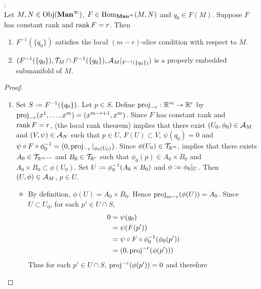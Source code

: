 \documentclass{book}
\begin{document}
	\begin{ex}  : \\
		Let $M, N \in \operatorname{Obj}(\operatorname*{\text{\textbf{Man}}^{\infty}})$, $F \in \operatorname{Hom}_{\operatorname*{\text{\textbf{Man}}^{\infty}}}(M,N)$ and $q_0 \in F(M)$. Suppose $F$ has constant rank and $\operatorname{\text{rank}} F = r$. Then 
		\begin{enumerate}
			\item $F^{-1}(\{q_0\})$ satisfies the local $(m-r)$-slice condition with respect to $M$. 
			\item $(F^{-1}(\{q_0\}), \mathcal{T}_M \cap F^{-1}(\{q_0\}), \mathcal{A}_M|_{F^{-1}(\{q_0\})})$ is a properly embedded submanifold of $M$.
		\end{enumerate}
	\end{ex}

	\begin{proof}\
		\begin{enumerate}
			\item Set $S \vcentcolon= F^{-1}(\{q_0\})$. Let $p \in S$. Define $\operatorname{\text{proj}}_{-r}: \mathbb{R}^m \rightarrow \mathbb{R}^{r}$ by $\operatorname{\text{proj}}_{-r}(x^1, \ldots, x^m) = (x^{m-r+1}, x^{m})$. Since $F$ has constant rank and $\operatorname{\text{rank}} F = r$,  (the local rank theorem)  implies that there exist $(U_0, \phi_0) \in \mathcal{A}_M$ and $(V, \psi) \in \mathcal{A}_N$ such that $p \in U$, $F(U) \subset V$, $\psi(q_0) = 0$ and $\psi \circ F \circ \phi_0^{-1} = (0, \operatorname{\text{proj}}_{-r}|_{\phi_0(U_0)})$. Since $\phi(U_0) \in \mathcal{T}_{\mathbb{R}^m}$,  implies that there exists $A_0 \in \mathcal{T}_{\mathbb{R}^{m-r}}$ and $B_0 \in \mathcal{T}_{\mathbb{R}^{r}}$ such that $\phi_0(p) \in A_0 \times B_0$ and $A_0 \times B_0 \subset \phi(U_0)$. Set $U \vcentcolon= \phi_0^{-1}(A_0 \times B_0)$ and $\phi \vcentcolon= \phi_0|_U$. Then $(U, \phi) \in \mathcal{A}_M$, $p \in U$. 
			\begin{itemize}
				\item By definition, $\phi(U) = A_0 \times B_0$. Hence $\operatorname{\text{proj}}_{m-r}(\phi(U)) = A_0$. Since $U \subset U_0$, for each $p' \in U \cap S$, 
				\begin{align*}
					0
					& = \psi(q_0) \\
					& = \psi(F(p')) \\
					& = \psi \circ F \circ \phi_0^{-1}(\phi_0(p')) \\
					& = (0, \operatorname{\text{proj}}^{-r}(\phi(p')))
				\end{align*}
				Thus for each $p' \in U \cap S$, $\operatorname{\text{proj}}^{-r}(\phi(p')) = 0$ and therefore 

\end{itemize}
\end{enumerate}
\end{proof}
\end{document}
